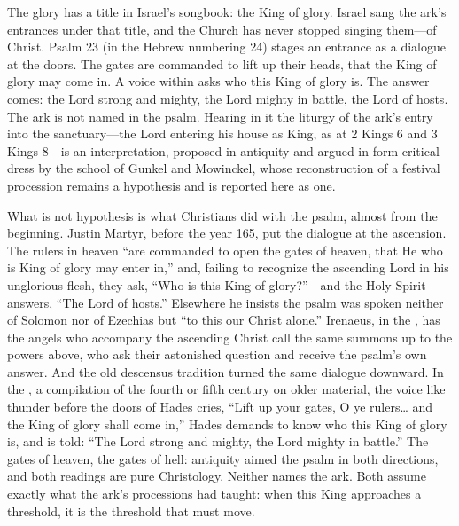The glory has a title in Israel's songbook: the King of glory. Israel
sang the ark's entrances under that title, and the Church has never
stopped singing them---of Christ. Psalm 23 (in the Hebrew numbering 24)
stages an entrance as a dialogue at the doors. The gates are commanded
to lift up their heads, that the King of glory may come in. A voice
within asks who this King of glory is. The answer comes: the Lord
strong and mighty, the Lord mighty in battle, the Lord of hosts. The
ark is not named in the psalm. Hearing in it the liturgy of the ark's
entry into the sanctuary---the Lord entering his house as King, as at 2
Kings 6 and 3 Kings 8---is an interpretation, proposed in antiquity and
argued in form-critical dress by the school of Gunkel and Mowinckel,
whose reconstruction of a festival procession remains a hypothesis and
is reported here as one.

What is not hypothesis is what Christians did with the psalm, almost
from the beginning. Justin Martyr, before the year 165, put the
dialogue at the ascension. The rulers in heaven ``are commanded to open
the gates of heaven, that He who is King of glory may enter in,'' and,
failing to recognize the ascending Lord in his unglorious flesh, they
ask, ``Who is this King of glory?''---and the Holy Spirit answers,
``The Lord of hosts.'' Elsewhere he insists the psalm was spoken
neither of Solomon nor of Ezechias but ``to this our Christ
alone.'' Irenaeus, in the
, has the angels who
accompany the ascending Christ call the same summons up to the powers
above, who ask their astonished question and receive the psalm's own
answer. And the
old descensus tradition turned the same dialogue downward. In the
, a compilation of the fourth or fifth
century on older material, the voice like thunder before the doors of
Hades cries, ``Lift up your gates, O ye rulers\ldots{} and the King of
glory shall come in,'' Hades demands to know who this King of glory
is, and is told: ``The Lord strong and mighty, the Lord mighty in
battle.'' The
gates of heaven, the gates of hell: antiquity aimed the psalm in both
directions, and both readings are pure Christology. Neither names the
ark. Both assume exactly what the ark's processions had taught: when
this King approaches a threshold, it is the threshold that must move.


